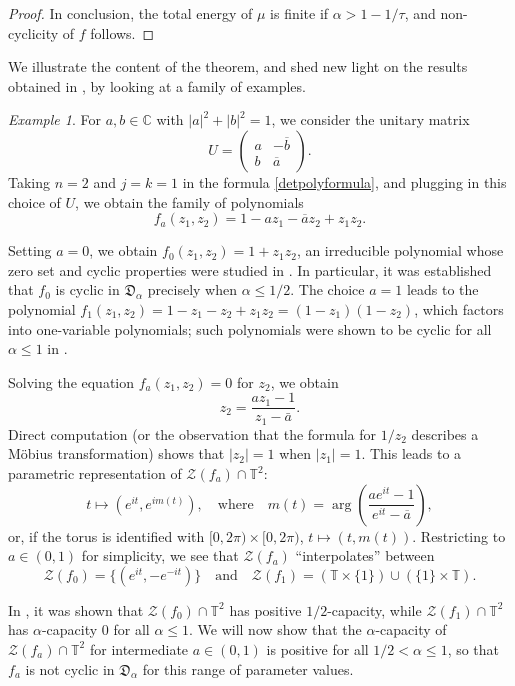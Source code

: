 \documentclass[11 pt,reqno]{amsart}
\theoremstyle{definition}
\theoremstyle{remark}
\newtheorem{ex}{Example}
\numberwithin{equation}{section} \numberwithin{figure}{section}
\begin{document}
\begin{proof}
In conclusion, the total energy of $\mu$ is finite if
$
\alpha>
1-1/\tau$, and non-cyclicity of $f$ follows.
\end{proof}
We illustrate the content of the theorem, and shed new light on the results obtained in \cite{BCLSS13II}, by looking at a family of examples.
\begin{ex}
For $a, b \in {{\mathbb C}}$ with $|a|^2+|b|^2=1$, we consider the unitary matrix
\[ U=\left(\begin{array}{cc}a & -\overline{b}\\ b& \overline{a}\end{array}\right).\]
Taking $n=2$ and $j=k=1$ in the formula \eqref{detpolyformula}, and plugging in this choice of $U$, we obtain the family of polynomials
\begin{equation}
f_{a}(z_1,z_2)=1-az_1-\overline{a}z_2+z_1z_2.
\label{apolyfamily}
\end{equation}

Setting $a=0$, we obtain $f_0(z_1,z_2)=1+z_1z_2$, an irreducible
polynomial whose zero set and cyclic properties were studied in
\cite[Section 4]{BCLSS13II}. In particular, it was established that
$f_0$ is cyclic in $\mathfrak{D}_{\alpha}$ precisely when $\alpha\leq
1/2$.  The choice $a=1$ leads to the polynomial
$f_1(z_1,z_2)=1-z_1-z_2+z_1z_2=(1-z_1)(1-z_2)$, which factors into
one-variable polynomials; such polynomials were shown to be cyclic for
all $\alpha\leq 1$ in \cite[Section 2]{BCLSS13II}.

Solving the equation $f_a(z_1,z_2)=0$
for $z_2$, we obtain
\[z_2=\frac{az_1-1}{z_1-\bar{a}}.\] Direct computation (or the
observation that the formula for $1/z_2$ describes a M\"obius
transformation) shows that $|z_2|=1$ when $|z_1|=1$.  This leads to a
parametric representation of $\mathcal{Z}(f_a)\cap \mathbb{T}^2$:
\begin{equation}
t\mapsto (e^{it}, e^{i m(t)}),\quad
\textrm{where} \quad
m(t)=\arg\left(\frac{ae^{it}-1}{e^{it}-\overline{a}}\right),
\label{moebzeros}
\end{equation}
or, if the torus is identified with $[0,2\pi)\times [0, 2\pi)$,
$t\mapsto (t, m(t))$.  Restricting to $a \in (0,1)$ for simplicity, we
see that $\mathcal{Z}(f_a)$ ``interpolates'' between
\[
\mathcal{Z}(f_0)=\{(e^{it}, -e^{-it})\} \quad \textrm{and}\quad
\mathcal{Z}(f_1)=(\mathbb{T}\times \{1\})\cup (\{1\}\times \mathbb{T}). \]

In \cite{BCLSS13II}, it was shown that $\mathcal{Z}(f_0)\cap \mathbb{T}^2$ has positive $1/2$-capacity, while $\mathcal{Z}(f_1)\cap\mathbb{T}^2$ has $\alpha$-capacity $0$ for all $\alpha\leq 1$. We will now show that the $\alpha$-capacity of $\mathcal{Z}(f_a)\cap \mathbb{T}^2$ for intermediate $a\in (0,1)$ is positive for all  
$1/2<\alpha \le 1$, so that $f_a$ is not cyclic in $\mathfrak{D}_{\alpha}$ for this range of parameter values.


\end{ex}
\end{document}
